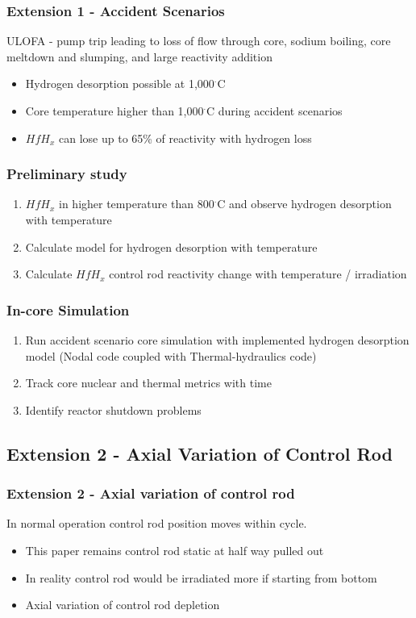 \documentclass[9pt]{beamer}
\newcommand{\hfh}{$HfH_{x}$\xspace}
\begin{document}
\begin{frame}
\frametitle{Extension 1 - Accident Scenarios}
\gls{ULOFA} - pump trip leading to loss of flow through core, sodium boiling, core meltdown and slumping,
and large reactivity addition \cite{raghupathy_source_2017}
\begin{itemize}
    \item Hydrogen desorption possible at 1,000$^\cdot$C \cite{konashi_development_2013}
    \item Core temperature higher than 1,000$^\cdot$C during accident scenarios
    \item \hfh can lose up to 65\% of reactivity with hydrogen loss
\end{itemize}
\end{frame}


\begin{frame}
\frametitle{Preliminary study}
\begin{enumerate}
    \item \hfh in higher temperature than 800$^\cdot$C and observe hydrogen desorption with temperature
    \item Calculate model for hydrogen desorption with temperature
    \item Calculate \hfh control rod reactivity change with temperature / irradiation
\end{enumerate}
\end{frame}

\begin{frame}
\frametitle{In-core Simulation}
\begin{enumerate}
    \item Run accident scenario core simulation with implemented hydrogen desorption
          model (Nodal code coupled with Thermal-hydraulics code)
    \item Track core nuclear and thermal metrics with time
    \item Identify reactor shutdown problems
\end{enumerate}
\end{frame}

\subsection{Extension 2 - Axial Variation of Control Rod}

\begin{frame}
\frametitle{Extension 2 - Axial variation of control rod}
In normal operation control rod position moves within cycle.
\begin{itemize}
    \item This paper remains control rod static at half way pulled out
    \item In reality control rod would be irradiated more if starting from bottom
    \item Axial variation of control rod depletion
\end{itemize}
\end{frame}
\end{document}
